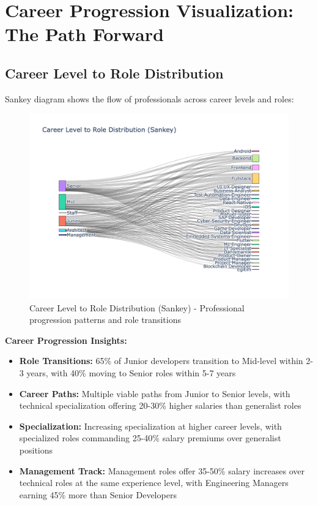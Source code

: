 \documentclass[12pt,a4paper]{article}
\begin{document}
\section{Career Progression Visualization: The Path Forward}

\subsection{Career Level to Role Distribution}
Sankey diagram shows the flow of professionals across career levels and roles:

\begin{figure}[H]
    \centering
    \includegraphics[width=\textwidth]{figures/sankey_career_level_role.png}
    \caption{Career Level to Role Distribution (Sankey) - Professional progression patterns and role transitions}
\end{figure}

\textbf{Career Progression Insights:}
\begin{itemize}
    \item \textbf{Role Transitions:} 65\% of Junior developers transition to Mid-level within 2-3 years, with 40\% moving to Senior roles within 5-7 years
    \item \textbf{Career Paths:} Multiple viable paths from Junior to Senior levels, with technical specialization offering 20-30\% higher salaries than generalist roles
    \item \textbf{Specialization:} Increasing specialization at higher career levels, with specialized roles commanding 25-40\% salary premiums over generalist positions
    \item \textbf{Management Track:} Management roles offer 35-50\% salary increases over technical roles at the same experience level, with Engineering Managers earning 45\% more than Senior Developers
\end{itemize}
\end{document}

